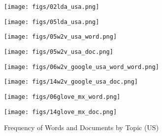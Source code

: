 \documentclass{article}
\begin{document}
\begin{figure}[H]
    \begin{minipage}[b]{0.5\linewidth}
    \centering
  \centering
  \texttt{[image: figs/02lda\_usa.png]}
    \vspace{1ex}
  \end{minipage}
    \begin{minipage}[b]{0.5\linewidth}
    \centering
  \centering
  \texttt{[image: figs/05lda\_usa.png]}
    \vspace{1ex}
  \end{minipage}
  
    \begin{minipage}[b]{0.5\linewidth}
    \centering
  \centering
  \texttt{[image: figs/05w2v\_usa\_word.png]}  
    \vspace{1ex}
  \end{minipage}
    \begin{minipage}[b]{0.5\linewidth}
    \centering
  \centering
  \texttt{[image: figs/05w2v\_usa\_doc.png]}
    \vspace{1ex}
  \end{minipage}
  
  \begin{minipage}[b]{0.5\linewidth}
    \centering
  \centering
  \texttt{[image: figs/06w2v\_google\_usa\_word\_word.png]}
  \centering \vspace{1ex}
  \end{minipage} 
  \begin{minipage}[b]{0.5\linewidth}
    \centering
  \centering
  \texttt{[image: figs/14w2v\_google\_usa\_doc.png]}
  \centering \vspace{1ex}
  \end{minipage}
    \begin{minipage}[b]{0.5\linewidth}
    \centering
  \centering
  \texttt{[image: figs/06glove\_mx\_word.png]}
  \centering \vspace{1ex}
  \end{minipage} 
  \begin{minipage}[b]{0.5\linewidth}
    \centering
  \centering
  \texttt{[image: figs/14glove\_mx\_doc.png]}
  \centering \vspace{1ex}
  \end{minipage}
    \caption{Frequency of Words and Documents by Topic (US)}
    \label{fig:chap3.fig3}
\end{figure}
\end{document}
